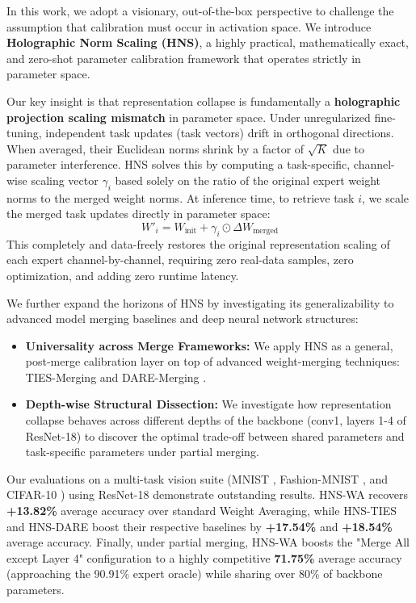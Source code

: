 \documentclass{article}
\theoremstyle{plain}
\theoremstyle{definition}
\theoremstyle{remark}
\begin{document}
In this work, we adopt a visionary, out-of-the-box perspective to challenge the assumption that calibration must occur in activation space. We introduce \textbf{Holographic Norm Scaling (HNS)}, a highly practical, mathematically exact, and zero-shot parameter calibration framework that operates strictly in parameter space.

Our key insight is that representation collapse is fundamentally a \textbf{holographic projection scaling mismatch} in parameter space. Under unregularized fine-tuning, independent task updates (task vectors) drift in orthogonal directions. When averaged, their Euclidean norms shrink by a factor of $\sqrt{K}$ due to parameter interference. HNS solves this by computing a task-specific, channel-wise scaling vector $\gamma_i$ based solely on the ratio of the original expert weight norms to the merged weight norms. At inference time, to retrieve task $i$, we scale the merged task updates directly in parameter space:
\begin{equation}
  W'_i = W_{\text{init}} + \gamma_i \odot \Delta W_{\text{merged}}
\end{equation}
This completely and data-freely restores the original representation scaling of each expert channel-by-channel, requiring zero real-data samples, zero optimization, and adding zero runtime latency.

We further expand the horizons of HNS by investigating its generalizability to advanced model merging baselines and deep neural network structures:
\begin{itemize}
  \item \textbf{Universality across Merge Frameworks:} We apply HNS as a general, post-merge calibration layer on top of advanced weight-merging techniques: TIES-Merging \cite{yadav23} and DARE-Merging \cite{yu23}.
  \item \textbf{Depth-wise Structural Dissection:} We investigate how representation collapse behaves across different depths of the backbone (conv1, layers 1-4 of ResNet-18) to discover the optimal trade-off between shared parameters and task-specific parameters under partial merging.
\end{itemize}

Our evaluations on a multi-task vision suite (MNIST \cite{lecun98}, Fashion-MNIST \cite{xiao17}, and CIFAR-10 \cite{krizhevsky09}) using ResNet-18 \cite{he16} demonstrate outstanding results. HNS-WA recovers \textbf{+13.82\%} average accuracy over standard Weight Averaging, while HNS-TIES and HNS-DARE boost their respective baselines by \textbf{+17.54\%} and \textbf{+18.54\%} average accuracy. Finally, under partial merging, HNS-WA boosts the "Merge All except Layer 4" configuration to a highly competitive \textbf{71.75\%} average accuracy (approaching the 90.91\% expert oracle) while sharing over 80\% of backbone parameters.
\end{document}
